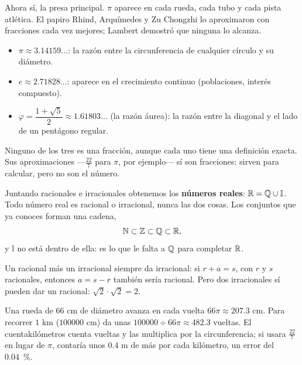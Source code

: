 \documentclass[11pt]{article}
\newcommand{\I}{\mathbb{I}}
\begin{document}
\label{tema:irracionalesvidareal}

\begin{hilo}
Ahora sí, la presa principal. $\pi$ aparece en cada rueda, cada tubo y cada
pista atlética. El papiro Rhind, Arquímedes y Zu Chongzhi lo aproximaron con
fracciones cada vez mejores; Lambert demostró que ninguna lo alcanza.
\end{hilo}

\begin{ejemplo}
\begin{itemize}
  \item $\pi \approx \num{3,14159}\ldots$: la razón entre la circunferencia
        de cualquier círculo y su diámetro.
  \item $e \approx \num{2,71828}\ldots$: aparece en el crecimiento continuo
        (poblaciones, interés compuesto).
  \item $\varphi = \dfrac{1 + \sqrt{5}}{2} \approx \num{1,61803}\ldots$ (la
        razón áurea): la razón entre la diagonal y el lado de un pentágono
        regular.
\end{itemize}
Ninguno de los tres es una fracción, aunque cada uno tiene una definición
exacta. Sus aproximaciones —$\frac{22}{7}$ para $\pi$, por ejemplo— sí son
fracciones: sirven para calcular, pero no son el número.
\end{ejemplo}

Juntando racionales e irracionales obtenemos los \textbf{números reales}:
$\R = \Q \cup \I$. Todo número real es racional o irracional, nunca las dos
cosas. Los conjuntos que ya conoces forman una cadena,
\[
  \mathbb{N} \subset \mathbb{Z} \subset \mathbb{Q} \subset \mathbb{R},
\]
y $\I$ no está dentro de ella: es lo que le falta a $\mathbb{Q}$ para completar $\mathbb{R}$.

\begin{ejemplo}
Un racional más un irracional siempre da irracional: si $r + a = s$, con $r$
y $s$ racionales, entonces $a = s - r$ también sería racional. Pero dos
irracionales sí pueden dar un racional: $\sqrt{2} \cdot \sqrt{2} = 2$.
\end{ejemplo}

\begin{aplicacion}
Una rueda de $66$ cm de diámetro avanza en cada vuelta $66\pi \approx
\num{207,3}$ cm. Para recorrer $1$ km ($\num{100000}$ cm) da unas
$\num{100000} \div 66\pi \approx \num{482,3}$ vueltas. El cuentakilómetros
cuenta vueltas y las multiplica por la circunferencia; si usara
$\frac{22}{7}$ en lugar de $\pi$, contaría unos $\num{0,4}$ m de más por
cada kilómetro, un error del \qty{0,04}{\percent}.
\end{aplicacion}
\end{document}
